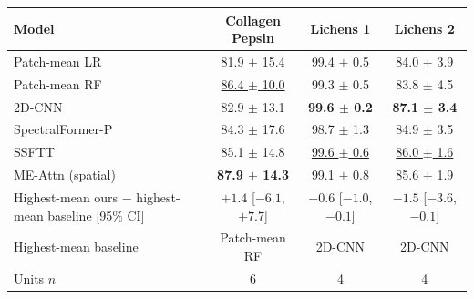 \small
\begin{tabular}{lccc}
\toprule
Model & Collagen Pepsin & Lichens 1 & Lichens 2 \\
\midrule
Patch-mean LR & 81.9 $\pm$ 15.4 & 99.4 $\pm$ 0.5 & 84.0 $\pm$ 3.9 \\
Patch-mean RF & \underline{86.4 $\pm$ 10.0} & 99.3 $\pm$ 0.5 & 83.8 $\pm$ 4.5 \\
2D-CNN & 82.9 $\pm$ 13.1 & \textbf{99.6 $\pm$ 0.2} & \textbf{87.1 $\pm$ 3.4} \\
SpectralFormer-P & 84.3 $\pm$ 17.6 & 98.7 $\pm$ 1.3 & 84.9 $\pm$ 3.5 \\
SSFTT & 85.1 $\pm$ 14.8 & \underline{99.6 $\pm$ 0.6} & \underline{86.0 $\pm$ 1.6} \\
\midrule
ME-Attn (spatial) & \textbf{87.9 $\pm$ 14.3} & 99.1 $\pm$ 0.8 & 85.6 $\pm$ 1.9 \\
\midrule
Highest-mean ours $-$ highest-mean baseline [95\% CI] & $+1.4$ [$-6.1$, $+7.7$] & $-0.6$ [$-1.0$, $-0.1$] & $-1.5$ [$-3.6$, $-0.1$] \\
Highest-mean baseline & Patch-mean RF & 2D-CNN & 2D-CNN \\
\midrule
Units $n$ & 6 & 4 & 4 \\
\bottomrule
\end{tabular}
